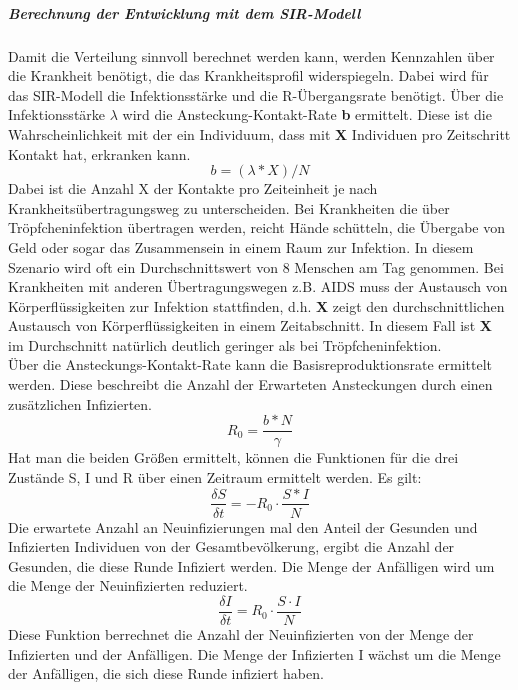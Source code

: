 \subparagraph{Berechnung der Entwicklung mit dem SIR-Modell}
Damit die Verteilung sinnvoll berechnet werden kann, werden Kennzahlen über die Krankheit benötigt, die das Krankheitsprofil widerspiegeln. Dabei wird für das SIR-Modell die Infektionsstärke und die \grqq R\glqq{}-Übergangsrate benötigt.
Über die Infektionsstärke $\lambda$ wird die Ansteckung-Kontakt-Rate \textbf{b} ermittelt. Diese ist die Wahrscheinlichkeit mit der ein Individuum, dass mit \textbf{X} Individuen pro Zeitschritt Kontakt hat, erkranken kann.
\begin{equation}
b = ( \lambda * X ) / N
\end{equation}
Dabei ist die Anzahl X der Kontakte pro Zeiteinheit je nach Krankheitsübertragungsweg zu unterscheiden. Bei Krankheiten die über Tröpfcheninfektion übertragen werden, reicht Hände schütteln, die Übergabe von Geld oder sogar das Zusammensein in einem Raum zur Infektion. In diesem Szenario wird oft ein Durchschnittswert von 8 Menschen am Tag genommen.%
Bei Krankheiten mit anderen Übertragungswegen z.B. AIDS muss der Austausch von Körperflüssigkeiten zur Infektion stattfinden, d.h. \textbf{X} zeigt den durchschnittlichen Austausch von Körperflüssigkeiten in einem Zeitabschnitt. In diesem Fall ist \textbf{X} im Durchschnitt natürlich deutlich geringer als bei Tröpfcheninfektion.\\
Über die Ansteckungs-Kontakt-Rate kann die Basisreproduktionsrate ermittelt werden. Diese beschreibt die Anzahl der Erwarteten Ansteckungen durch einen zusätzlichen Infizierten.
\begin{equation}
R_0 = \frac{ b * N }{ \gamma }
\end{equation}
Hat man die beiden Größen ermittelt, können die Funktionen für die drei Zustände S, I und R über einen Zeitraum ermittelt werden. 
Es gilt:
\begin{equation}
\frac{ \delta S }{ \delta t } = -R_0 \cdot \frac{S * I}{N}
\end{equation}
Die erwartete Anzahl an Neuinfizierungen mal den Anteil der Gesunden und Infizierten Individuen von der Gesamtbevölkerung, ergibt die Anzahl der Gesunden, die diese Runde Infiziert werden. Die Menge der Anfälligen wird um die Menge der Neuinfizierten reduziert.
\begin{equation}
\frac{\delta I }{\delta t} = R_0 \cdot \frac{S \cdot I}{N}
\end{equation}
Diese Funktion berrechnet die Anzahl der Neuinfizierten von der Menge der Infizierten und der Anfälligen. Die Menge der Infizierten I wächst um die Menge der Anfälligen, die sich diese Runde infiziert haben.
